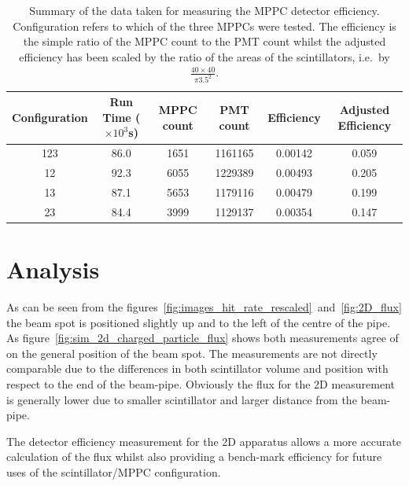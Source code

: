 \begin{table}
    \begin{center}
    \begin{tabular}{c | c | c | c | c | c}
        Configuration  &  Run Time (\(\times 10^3\)s)  &  MPPC count  &  PMT count  &  Efficiency  &  Adjusted Efficiency \\
        \hline
        123            &  86.0                         &   1651       &  1161165    &  0.00142     &  0.059  \\
        12             &  92.3                         &   6055       &  1229389    &  0.00493     &  0.205  \\
        13             &  87.1                         &   5653       &  1179116    &  0.00479     &  0.199  \\
        23             &  84.4                         &   3999       &  1129137    &  0.00354     &  0.147  \\
        
    \end{tabular}
    \end{center}
    \caption{Summary of the data taken for measuring the MPPC detector efficiency. Configuration refers to which of the three MPPCs were tested. The efficiency is the simple ratio of the MPPC count to the PMT count whilst the adjusted efficiency has been scaled by the ratio of the areas of the scintillators, i.e.\ by \( \frac{40\times40}{\pi3.5^2} \).}
    \label{tab:music2_eff}
\end{table}
\section{Analysis} %
\label{sec:analysis}
As can be seen from the figures~\ref{fig:images_hit_rate_rescaled}~and~\ref{fig:2D_flux} the beam spot is positioned slightly up and to the left of the centre of the pipe. As figure~\ref{fig:sim_2d_charged_particle_flux} shows both measurements agree of on the general position of the beam spot. The measurements are not directly comparable due to the differences in both scintillator volume and position with respect to the end of the beam-pipe. Obviously the flux for the 2D measurement is generally lower due to smaller scintillator and larger distance from the beam-pipe.

The detector efficiency measurement for the 2D apparatus allows a more accurate calculation of the flux whilst also providing a bench-mark efficiency for future uses of the scintillator/MPPC configuration. 

